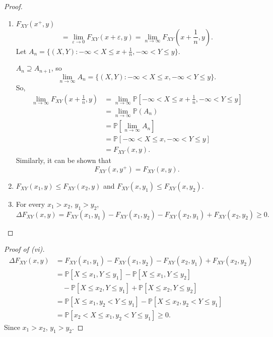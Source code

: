 \begin{proof}
\begin{enumerate}
        \item[(iv)] $F_{XY}(x^+, y)$
        \[
            = \lim_{\varepsilon \to 0} F_{XY}(x + \varepsilon, y) = \lim_{n \to \infty} F_{XY}\left(x + \frac{1}{n}, y\right).
        \]
        Let $A_n = \{(X, Y): -\infty < X \leq x + \frac{1}{n}, -\infty < Y \leq y\}$.

        $A_n \supseteq A_{n+1}$, so
        \[
            \lim_{n \to \infty} A_n = \{(X, Y): -\infty < X \leq x, -\infty < Y \leq y\}.
        \]
        So,
        \begin{align*}
            \lim_{n \to \infty} F_{XY}\left(x + \frac{1}{n}, y\right) &= \lim_{n \to \infty} \mathbb{P}\left[-\infty < X \leq x + \frac{1}{n}, -\infty < Y \leq y\right]\\
            &= \lim_{n \to \infty} \mathbb{P}(A_n)\\
            &= \mathbb{P}\left[ \lim_{n \to \infty} A_n \right]\\
            &= \mathbb{P}[-\infty < X \leq x, -\infty < Y \leq y]\\
            &= F_{XY}(x, y).
        \end{align*}
        Similarly, it can be shown that
        \[
            F_{XY}(x, y^+) = F_{XY}(x, y).
        \]

        \item[(v)] $F_{XY}(x_1, y) \leq F_{XY}(x_2, y)$ and $F_{XY}(x, y_1) \leq F_{XY}(x, y_2)$.

        \item[(vi)] For every $x_1 > x_2$, $y_1 > y_2$,
        \[
            \Delta F_{XY}(x, y) = F_{XY}(x_1, y_1) - F_{XY}(x_1, y_2) - F_{XY}(x_2, y_1) + F_{XY}(x_2, y_2) \geq 0.
        \]
    \end{enumerate}
\end{proof}
\begin{proof}[Proof of (vi)]
    \begin{align*}
        \Delta F_{XY}(x, y) &= F_{XY}(x_1, y_1) - F_{XY}(x_1, y_2) - F_{XY}(x_2, y_1) + F_{XY}(x_2, y_2)\\
        &= \mathbb{P}[X \leq x_1, Y \leq y_1] - \mathbb{P}[X \leq x_1, Y \leq y_2]\\
        &\quad - \mathbb{P}[X \leq x_2, Y \leq y_1] + \mathbb{P}[X \leq x_2, Y \leq y_2]\\
        &= \mathbb{P}[X \leq x_1, y_2 < Y \leq y_1] - \mathbb{P}[X \leq x_2, y_2 < Y \leq y_1]\\
        &= \mathbb{P}[x_2 < X \leq x_1, y_2 < Y \leq y_1] \geq 0.
    \end{align*}
    Since $x_1 > x_2$, $y_1 > y_2$.
\end{proof}

